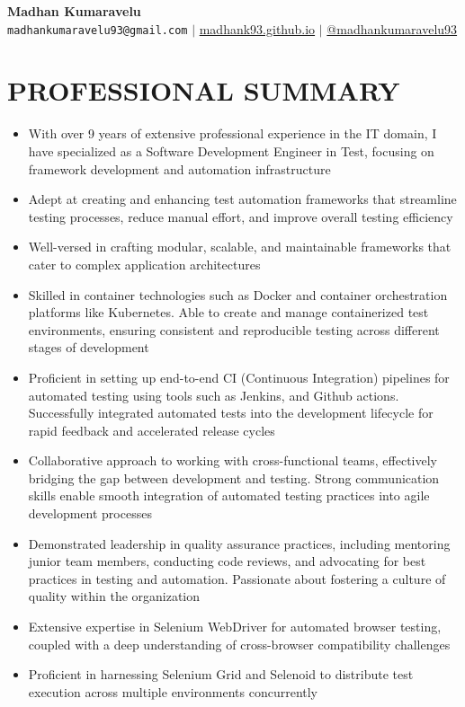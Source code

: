 \documentclass[letterpaper,11pt]{article}
\newcommand{\resumeItem}[1]{
  \item\small{
    {#1 \vspace{-1pt}}
  }
}
\begin{document}
\begin{center}
    \textbf{\Huge Madhan Kumaravelu} \\ \vspace{5pt}
    \hspace{1pt} \faEnvelope \hspace{2pt} \texttt{madhankumaravelu93@gmail.com} \hspace{1pt} $|$ 
    \hspace{1pt} \faGlobe \hspace{2pt} \href{http://madhank93.github.io/}{madhank93.github.io} \hspace{1pt} $|$
    \hspace{1pt} \faMedium \hspace{2pt} \href{https://medium.com/@madhankumaravelu93}{@madhankumaravelu93}
    \\ \vspace{-3pt}
\end{center}

\section{PROFESSIONAL SUMMARY}
\begin{itemize}[noitemsep,topsep=0pt]
    \resumeItem{With over 9 years of extensive professional experience in the IT domain, I have specialized as a Software Development Engineer in Test, focusing on framework development and automation infrastructure}
    \resumeItem{Adept at creating and enhancing test automation frameworks that streamline testing processes, reduce manual effort, and improve overall testing efficiency}
    \resumeItem{Well-versed in crafting modular, scalable, and maintainable frameworks that cater to complex application architectures}
    \resumeItem{Skilled in container technologies such as Docker and container orchestration platforms like Kubernetes. Able to create and manage containerized test environments, ensuring consistent and reproducible testing across different stages of development}
    \resumeItem{Proficient in setting up end-to-end CI (Continuous Integration) pipelines for automated testing using tools such as Jenkins, and Github actions. Successfully integrated automated tests into the development lifecycle for rapid feedback and accelerated release cycles}
    \resumeItem{Collaborative approach to working with cross-functional teams, effectively bridging the gap between development and testing. Strong communication skills enable smooth integration of automated testing practices into agile development processes}
    \resumeItem{Demonstrated leadership in quality assurance practices, including mentoring junior team members, conducting code reviews, and advocating for best practices in testing and automation. Passionate about fostering a culture of quality within the organization}
    \resumeItem{Extensive expertise in Selenium WebDriver for automated browser testing, coupled with a deep understanding of cross-browser compatibility challenges}
    \resumeItem{Proficient in harnessing Selenium Grid and Selenoid to distribute test execution across multiple environments concurrently}
\end{itemize}
\end{document}
